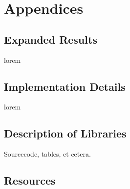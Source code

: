 \chapter{Appendices}

\section{Expanded Results}

lorem


\section{Implementation Details}

lorem


\section{Description of Libraries}

Sourcecode, tables, et cetera.


\section{Resources}
